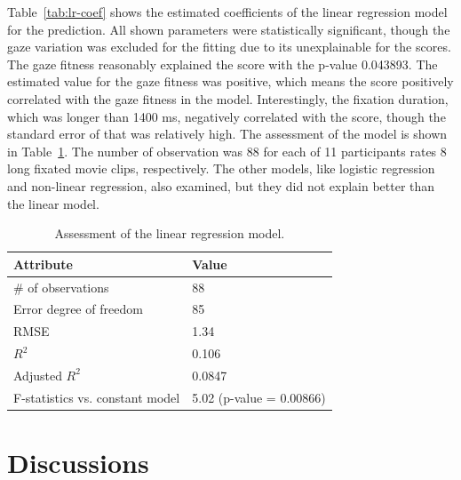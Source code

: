 \documentclass[oneside,master]{snueethesis}
\begin{document}
Table~\ref{tab:lr-coef} shows the estimated coefficients of the linear regression model for the prediction. All shown parameters were statistically significant, though the gaze variation was excluded for the fitting due to its unexplainable for the scores. The gaze fitness reasonably explained the score with the p-value 0.043893. The estimated value for the gaze fitness was positive, which means the score positively correlated with the gaze fitness in the model. Interestingly, the fixation duration, which was longer than 1400 ms, negatively correlated with the score, though the standard error of that was relatively high. The assessment of the model is shown in Table~\ref{tab:lr-goodness}. The number of observation was 88 for each of 11 participants rates 8 long fixated movie clips, respectively. The other models, like logistic regression and non-linear regression, also examined, but they did not explain better than the linear model.

\begin{table}[ht]
\begin{center} 
\caption{Assessment of the linear regression model.} 
\vskip 0.12in
\label{tab:lr-goodness} 
\begin{tabular}{ll} 
\hline
Attribute   & Value \\ 
\hline
\# of observations & 88 \\
Error degree of freedom & 85 \\
RMSE & 1.34 \\
$R^{2}$ & 0.106 \\
Adjusted $R^{2}$ & 0.0847 \\
F-statistics vs. constant model & 5.02 (p-value = 0.00866) \\
\hline
\end{tabular} 
\end{center} 
\end{table}

\chapter{Discussions}
\end{document}
